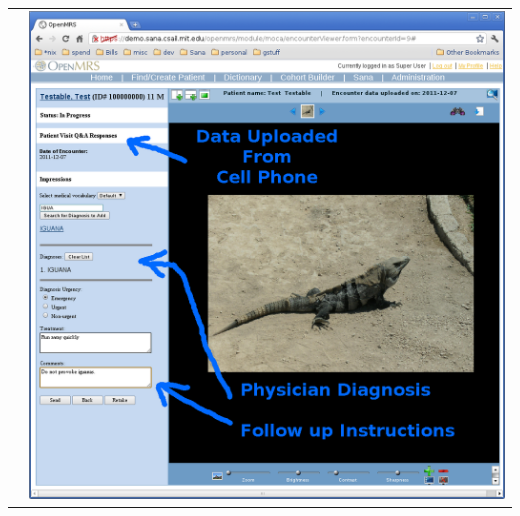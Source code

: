 \documentclass[a4paper,10pt]{article}
\begin{document}
\begin{flushleft}
\begin{tabular}{ c c }
&\includegraphics[scale=0.25,keepaspectratio=true]{openmrs_sana_encounter.png}
\end{tabular}
\end{flushleft}
\end{document}
